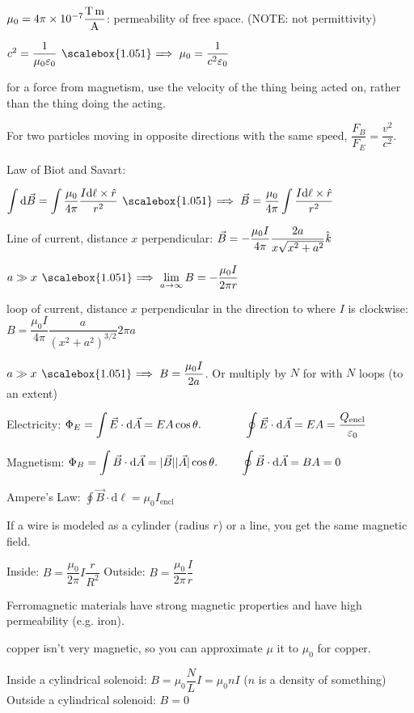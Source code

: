 \documentclass[12pt]{article}
\newcommand \dstyle \displaystyle
\newcommand \hpx [1]{\hspace{#1px}}
\newcommand \nhpx [1]{\hspace{-#1px}}
\renewcommand \implies {\hpx 4 \raisebox{-0.14px}{\scalebox{1.051} =} \nhpx{5.2} \Rightarrow \hpx 3}
\newcommand \khat {\hat{\textit k}}
\newcommand \encl {\mathrm{encl}}
\renewcommand \d {\mathrm d} %
\begin{document}
$\mu_0 = 4\pi \times 10^{-7} \dfrac{\rm T\,m}{\rm A}$: permeability of free space. (NOTE: not permittivity)

$c^2 = \dfrac 1 {\mu_0 \varepsilon_0} \implies \mu_0 = \dfrac 1 {c^2 \varepsilon_0}$

for a force from magnetism, use the velocity of the thing being acted on, rather than the thing doing the acting.

For two particles moving in opposite directions with the same speed, $\dfrac{F_B}{F_E} = \dfrac{v^2}{c^2}$.

Law of Biot and Savart:

$\dstyle \int \d\vec B = \int \dfrac{\mu_0}{4\pi} \dfrac{I \d\ell \times \hat r}{r^2}
	\implies \vec B = \dfrac{\mu_0}{4\pi} \int \dfrac{I \d\ell \times \hat r}{r^2}$

Line of current, distance $x$ perpendicular:
$\dstyle \vec B = -\dfrac{\mu_0 I}{4\pi} \dfrac{2a}{x \sqrt{x^2 + a^2}} \khat$

$\dstyle a \gg x \implies \dstyle \lim_{a\to\infty}B = -\dfrac{\mu_0 I}{2\pi r}$

loop of current, distance $x$ perpendicular in the direction to where $I$ is clockwise:
$B = \dfrac{\mu_0 I}{4\pi} \dfrac a {\left(x^2 + a^2\right)^{3/2}} 2\pi a$

$a \gg x \implies B = \dfrac{\mu_0 I}{2a}$. Or multiply by $N$ for with $N$ loops (to an extent)

Electricity:
$\dstyle \Phi_E = \int \vec E \cdot \d\vec A = EA\cos \theta. \hpx{38}
\oint \vec E \cdot \d\vec A = EA = \dfrac{Q_\encl}{\varepsilon_0}$

Magnetism: $\dstyle \Phi_B = \int \vec B \cdot \d\vec A = |\vec B| |\vec A| \cos \theta. \hpx{20}
\oint \vec B \cdot \d\vec A = BA = 0$

Ampere's Law: $\dstyle \oint \vec B \cdot \d\ell = \mu_0 I_\encl$

If a wire is modeled as a cylinder (radius $r$) or a line, you get the same magnetic field.

Inside: $B = \dfrac{\mu_0}{2 \pi} I \dfrac r {R^2}$
Outside: $B = \dfrac{\mu_0}{2 \pi} \dfrac I r$

Ferromagnetic materials have strong magnetic properties and have high permeability (e.g. iron).

copper isn't very magnetic, so you can approximate $\mu$ it to $\mu_0$ for copper.

Inside a cylindrical solenoid: $B = \mu_0 \dfrac N L I = \mu_0 n I$ ($n$ is a density of something)
Outside a cylindrical solenoid: $B = 0$
\end{document}
